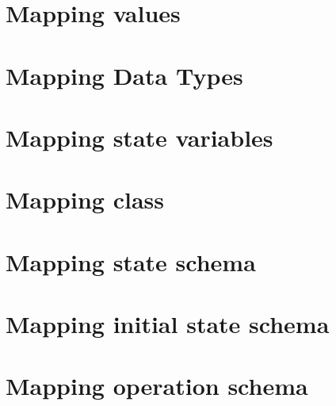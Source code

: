 \section{Mapping values}
\label{sec_tra_oz_mapping_values}


\section{Mapping Data Types}
\label{sec_tra_oz_mapping_data_types}


\section{Mapping state variables}
\label{sec_tra_oz_mapping_state_variables}


\section{Mapping class}
\label{sec_tra_oz_mapping_class}


\section{Mapping state schema}
\label{sec_tra_oz_mapping_state_schema}


\section{Mapping initial state schema}
\label{sec_tra_oz_mapping_initial_state_schema}


\section{Mapping operation schema}
\label{sec_tra_oz_mapping_operation_schema}

